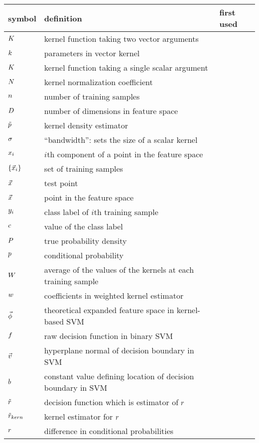 

\begin{tabular}{lll}
symbol & definition & first used \\ \hline
	$K$ & kernel function taking two vector arguments & \\
	$k$ & parameters in vector kernel & \\
	$K$ & kernel function taking a single scalar argument & \\
	$N$ & kernel normalization coefficient & \\
	$n$ & number of training samples & \\
	$D$ & number of dimensions in feature space & \\
	$\tilde p$ & kernel density estimator & \\
	$\sigma$ & ``bandwidth'': sets the size of a scalar kernel & \\
	$x_i$ & $i$th component of a point in the feature space & \\
	$\lbrace \vec {x}_i \rbrace$ & set of training samples & \\
	$\vec {x}$ & test point & \\
	$\vec {x}$ & point in the feature space & \\
	$y_i$ & class label of $i$th training sample & \\
	$c$ & value of the class label & \\
	$P$ & true probability density & \\
	$p$ & conditional probability & \\
	$W$ & average of the values of the kernels at each training sample & \\
	$w$ & coefficients in weighted kernel estimator & \\
	$\vec\phi$ & theoretical expanded feature space in kernel-based SVM & \\
	$f$ & raw decision function in binary SVM & \\
	$\vec v$ & hyperplane normal of decision boundary in SVM & \\
	$b$ & constant value defining location of decision boundary in SVM & \\
	$\tilde r$ & decision function which is estimator of $r$ & \\
	$\tilde r_{kern}$ & kernel estimator for $r$ & \\
	$r$ & difference in conditional probabilities & 
\end{tabular}



